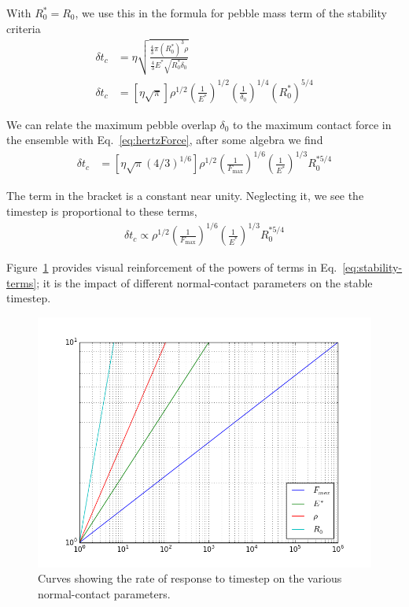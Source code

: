 With $R^*_0 = R_0$, we use this in the formula for pebble mass term of the stability criteria 
\begin{align}
\delta t_c &= \eta  \sqrt{\frac{\frac{4}{3} \pi (R^*_0)^3 \rho}{\frac{4}{3} E^* \sqrt{R^*_0 \delta_0}}}\\
\delta t_c &= \left[ \eta \sqrt{ \pi} \right] \rho^{1/2}\left(\frac{1}{E^*}\right)^{1/2} \left(\frac{1}{\delta_0}\right)^{1/4}(R^*_0)^{5/4}
\end{align}

We can relate the maximum pebble overlap $\delta_0$ to the maximum contact force in the ensemble with Eq.~\ref{eq:hertzForce}, after some algebra we find
\begin{align}
\delta t_c &= \left[ \eta \sqrt{ \pi} (4/3)^{1/6} \right] \rho^{1/2} \left(\frac{1}{F_\text{max}}\right)^{1/6} \left(\frac{1}{E^*}\right)^{1/3} R^{*5/4}_0
\end{align}

The term in the bracket is a constant near unity. Neglecting it, we see the timestep is proportional to these terms,
\begin{align}\label{eq:stability-terms}
\delta t_c \propto \rho^{1/2} \left(\frac{1}{F_\text{max}}\right)^{1/6} \left(\frac{1}{E^*}\right)^{1/3} R^{*5/4}_0
\end{align}

Figure~\ref{fig:stability-curves} provides visual reinforcement of the powers of terms in Eq.~\ref{eq:stability-terms}; it is the impact of different normal-contact parameters on the stable timestep. 
\begin{figure}[ht!]
\centering
\includegraphics[width = 0.75 \textwidth]{chapters/figures/stability_curves}
\caption{Curves showing the rate of response to timestep on the various normal-contact parameters.}\label{fig:stability-curves}
\end{figure}

